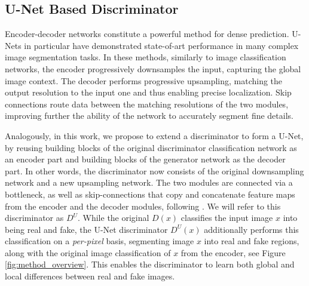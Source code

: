 \documentclass[10pt,twocolumn,letterpaper]{article}
\begin{document}
 

\subsection{U-Net Based Discriminator}\label{subsec:method-unet}


Encoder-decoder networks \cite{badrinarayanan2017segnet,Ronneberger2015UNetCN} constitute a powerful method for dense prediction. U-Nets \cite{Ronneberger2015UNetCN} in particular have demonstrated state-of-art performance in many complex image segmentation tasks. In these methods, similarly to image classification networks, the encoder progressively downsamples the input, capturing the global image context.
The decoder performs progressive upsampling, matching the output resolution to the input one and thus enabling precise localization. Skip connections route data between the matching resolutions of the two modules, improving further the ability of the network to accurately segment fine details.

Analogously, in this work, we propose to extend a discriminator to form a U-Net, by reusing building blocks of the original discriminator classification network as an encoder part and building blocks of the generator network as the decoder part. In other words, the discriminator now consists of the original downsampling network and a new upsampling network. The two modules are connected via a bottleneck, as well as skip-connections that copy and concatenate feature maps from the encoder and the decoder modules, following \cite{Ronneberger2015UNetCN}.  We will refer to this discriminator as $D^{U}$. While the original $D(x)$ classifies the input image $x$ into being real and fake, the U-Net discriminator $D^{U}(x)$ additionally performs this classification on a \textit{per-pixel} basis, segmenting image $x$ into real and fake regions, along with the original image classification of $x$ from the encoder, see Figure \ref{fig:method_overview}. This enables the discriminator to learn both global and local differences between real and fake images.
\end{document}
